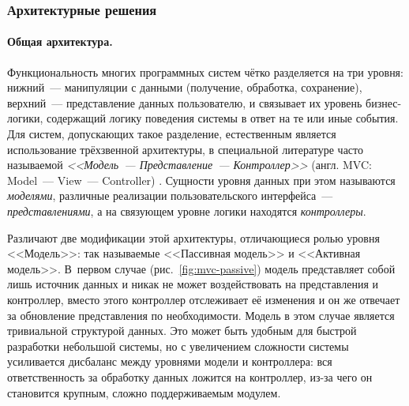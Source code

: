 \documentclass[a4paper, 14pt, titlepage]{extarticle}
\newcommand{\eng}[1]{\foreignlanguage{english}{#1}}
\newcommand{\term}[1]{\emph{#1}}
\let\oldparagraph\paragraph
\renewcommand{\paragraph}[1]{\oldparagraph{\indent #1}}
\begin{document}
  \subsubsection{Архитектурные решения}

  \paragraph{Общая архитектура.}
  Функциональность многих программных систем чётко разделяется на три уровня: нижний~---
  манипуляции с данными (получение, обработка, сохранение), верхний~--- представление данных
  пользователю, и связывает их уровень бизнес-логики, содержащий логику поведения системы в ответ
  на те или иные события. Для систем, допускающих такое разделение, естественным является
  использование трёхзвенной архитектуры, в специальной литературе часто называемой
  \term{<<Модель~--- Представление~--- Контроллер>>} (англ. \eng{MVC: Model~--- View~--- Controller})
  \cite{gamma-patterns}. Сущности уровня данных при этом называются \term{моделями}, различные
  реализации пользовательского интерфейса~--- \term{представлениями}, а на связующем уровне логики
  находятся \term{контроллеры}.

  Различают две модификации этой архитектуры, отличающиеся ролью уровня <<Модель>>: так называемые
  <<Пассивная модель>> и <<Активная модель>>. В~первом случае (рис.~\ref{fig:mvc-passive}) модель
  представляет собой лишь источник данных и никак не может воздействовать на представления и
  контроллер, вместо этого контроллер отслеживает её изменения и он же отвечает за обновление
  представления по необходимости. Модель в этом случае является тривиальной структурой данных. Это
  может быть удобным для быстрой разработки небольшой системы, но с увеличением сложности системы
  усиливается дисбаланс между уровнями модели и контроллера: вся ответственность за обработку данных
  ложится на контроллер, из-за чего он становится крупным, сложно поддерживаемым модулем.
\end{document}
